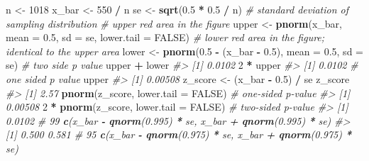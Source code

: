 \documentclass[]{book}
\newenvironment{Shaded}{\begin{snugshade}}{\end{snugshade}}
\newcommand{\CommentTok}[1]{\textcolor[rgb]{0.56,0.35,0.01}{\textit{#1}}}
\newcommand{\DataTypeTok}[1]{\textcolor[rgb]{0.13,0.29,0.53}{#1}}
\newcommand{\DecValTok}[1]{\textcolor[rgb]{0.00,0.00,0.81}{#1}}
\newcommand{\FloatTok}[1]{\textcolor[rgb]{0.00,0.00,0.81}{#1}}
\newcommand{\KeywordTok}[1]{\textcolor[rgb]{0.13,0.29,0.53}{\textbf{#1}}}
\newcommand{\NormalTok}[1]{#1}
\newcommand{\OperatorTok}[1]{\textcolor[rgb]{0.81,0.36,0.00}{\textbf{#1}}}
\newcommand{\OtherTok}[1]{\textcolor[rgb]{0.56,0.35,0.01}{#1}}
\newcommand{\StringTok}[1]{\textcolor[rgb]{0.31,0.60,0.02}{#1}}
\theoremstyle{definition}
\theoremstyle{definition}
\theoremstyle{definition}
\theoremstyle{remark}
\begin{document}
\begin{Shaded}
\begin{Highlighting}[]
\NormalTok{n <-}\StringTok{ }\DecValTok{1018}
\NormalTok{x_bar <-}\StringTok{ }\DecValTok{550} \OperatorTok{/}\StringTok{ }\NormalTok{n}
\NormalTok{se <-}\StringTok{ }\KeywordTok{sqrt}\NormalTok{(}\FloatTok{0.5} \OperatorTok{*}\StringTok{ }\FloatTok{0.5} \OperatorTok{/}\StringTok{ }\NormalTok{n) }\CommentTok{# standard deviation of sampling distribution}
\CommentTok{# upper red area in the figure}
\NormalTok{upper <-}\StringTok{ }\KeywordTok{pnorm}\NormalTok{(x_bar, }\DataTypeTok{mean =} \FloatTok{0.5}\NormalTok{, }\DataTypeTok{sd =}\NormalTok{ se, }\DataTypeTok{lower.tail =} \OtherTok{FALSE}\NormalTok{)}
\CommentTok{# lower red area in the figure; identical to the upper area}
\NormalTok{lower <-}\StringTok{ }\KeywordTok{pnorm}\NormalTok{(}\FloatTok{0.5} \OperatorTok{-}\StringTok{ }\NormalTok{(x_bar }\OperatorTok{-}\StringTok{ }\FloatTok{0.5}\NormalTok{), }\DataTypeTok{mean =} \FloatTok{0.5}\NormalTok{, }\DataTypeTok{sd =}\NormalTok{ se)}
\CommentTok{# two side p value}
\NormalTok{upper }\OperatorTok{+}\StringTok{ }\NormalTok{lower}
\CommentTok{#> [1] 0.0102}
\DecValTok{2} \OperatorTok{*}\StringTok{ }\NormalTok{upper}
\CommentTok{#> [1] 0.0102}
\CommentTok{# one sided p value}
\NormalTok{upper}
\CommentTok{#> [1] 0.00508}
\NormalTok{z_score <-}\StringTok{ }\NormalTok{(x_bar }\OperatorTok{-}\StringTok{ }\FloatTok{0.5}\NormalTok{) }\OperatorTok{/}\StringTok{ }\NormalTok{se}
\NormalTok{z_score}
\CommentTok{#> [1] 2.57}
\KeywordTok{pnorm}\NormalTok{(z_score, }\DataTypeTok{lower.tail =} \OtherTok{FALSE}\NormalTok{) }\CommentTok{# one-sided p-value}
\CommentTok{#> [1] 0.00508}
\DecValTok{2} \OperatorTok{*}\StringTok{ }\KeywordTok{pnorm}\NormalTok{(z_score, }\DataTypeTok{lower.tail =} \OtherTok{FALSE}\NormalTok{) }\CommentTok{# two-sided p-value}
\CommentTok{#> [1] 0.0102}
\CommentTok{# 99% confidence interval contains 0.5}
\KeywordTok{c}\NormalTok{(x_bar }\OperatorTok{-}\StringTok{ }\KeywordTok{qnorm}\NormalTok{(}\FloatTok{0.995}\NormalTok{) }\OperatorTok{*}\StringTok{ }\NormalTok{se, x_bar }\OperatorTok{+}\StringTok{ }\KeywordTok{qnorm}\NormalTok{(}\FloatTok{0.995}\NormalTok{) }\OperatorTok{*}\StringTok{ }\NormalTok{se)}
\CommentTok{#> [1] 0.500 0.581}
\CommentTok{# 95% confidence interval does not contain 0.5}
\KeywordTok{c}\NormalTok{(x_bar }\OperatorTok{-}\StringTok{ }\KeywordTok{qnorm}\NormalTok{(}\FloatTok{0.975}\NormalTok{) }\OperatorTok{*}\StringTok{ }\NormalTok{se, x_bar }\OperatorTok{+}\StringTok{ }\KeywordTok{qnorm}\NormalTok{(}\FloatTok{0.975}\NormalTok{) }\OperatorTok{*}\StringTok{ }\NormalTok{se)}
}}
\end{Highlighting}
\end{Shaded}
\end{document}
